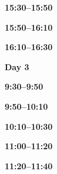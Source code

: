 \documentclass[12pt]{extbook}
\newcommand{\dayheader}[1]{
\clearpage
\begin{center}
\Large\bfseries Day #1
\end{center}
\bigskip}
\newcommand{\breaktime}[1]{
\bigskip
\begin{center}
\Large\bfseries ***** Break #1 *****
\end{center}
\bigskip}
\renewcommand{\breaktime}[1]{}
\newcommand{\abstract}[2]{{
\bigskip
\begin{center}
\large\bfseries #1
\end{center}}
\par

\clearpage
}
\begin{document}
\breaktime{30 min}

\abstract{15:30--15:50}{abstracts/Picard} %
\abstract{15:50--16:10}{abstracts/Hillegonds} %
\abstract{16:10--16:30}{abstracts/Engelhardt} %


\dayheader{3}

\abstract{9:30--9:50}{abstracts/Musy} %
\abstract{9:50--10:10}{abstracts/Zhao} %
\abstract{10:10--10:30}{abstracts/GroegerTrampe} %

\breaktime{30 min}


\abstract{11:00--11:20}{abstracts/Iwe} %
\abstract{11:20--11:40}{abstracts/Slagter} %









\end{document}

